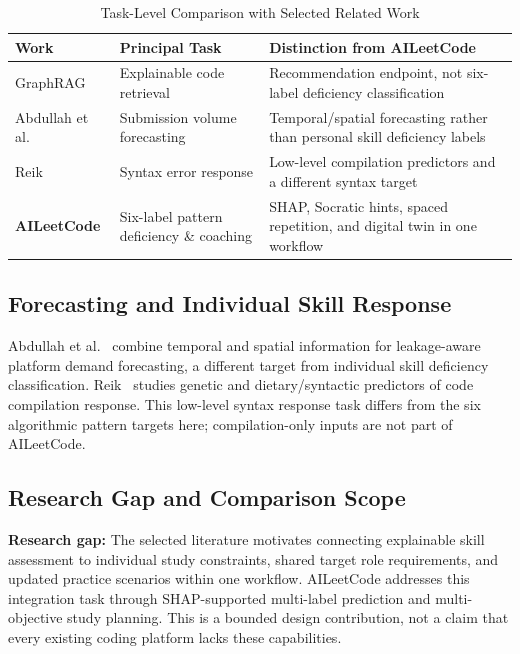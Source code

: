 \documentclass[conference]{IEEEtran}
\begin{document}
\begin{table}[t]
\centering
\caption{Task-Level Comparison with Selected Related Work}
\label{tab:related_work}
\begin{tabular}{lll}
\toprule
\textbf{Work} & \textbf{Principal Task} & \textbf{Distinction from AILeetCode} \\
\midrule
GraphRAG~\cite{dindukurthi2026explainable} & Explainable code retrieval & Recommendation endpoint, not six-label deficiency classification \\
Abdullah et al.~\cite{abdullah2026leakage} & Submission volume forecasting & Temporal/spatial forecasting rather than personal skill deficiency labels \\
Reik~\cite{reik2023genetic} & Syntax error response & Low-level compilation predictors and a different syntax target \\
\textbf{AILeetCode} & Six-label pattern deficiency \& coaching & SHAP, Socratic hints, spaced repetition, and digital twin in one workflow \\
\bottomrule
\end{tabular}
\end{table}

\subsection{Forecasting and Individual Skill Response}
Abdullah et al.~\cite{abdullah2026leakage} combine temporal and spatial information for leakage-aware platform demand forecasting, a different target from individual skill deficiency classification. Reik~\cite{reik2023genetic} studies genetic and dietary/syntactic predictors of code compilation response. This low-level syntax response task differs from the six algorithmic pattern targets here; compilation-only inputs are not part of AILeetCode.

\subsection{Research Gap and Comparison Scope}
\textbf{Research gap:} The selected literature motivates connecting explainable skill assessment to individual study constraints, shared target role requirements, and updated practice scenarios within one workflow. AILeetCode addresses this integration task through SHAP-supported multi-label prediction and multi-objective study planning. This is a bounded design contribution, not a claim that every existing coding platform lacks these capabilities.
\end{document}
